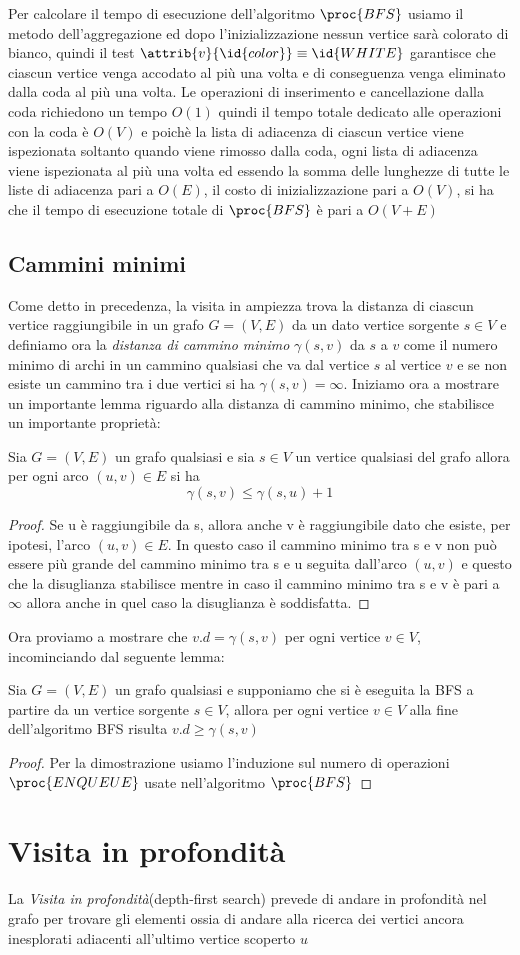 Per calcolare il tempo di esecuzione dell'algoritmo $\proc{BFS}$ usiamo il metodo dell'aggregazione ed dopo l'inizializzazione nessun vertice sarà colorato di bianco, 
quindi il test $\attrib{v}{\id{color}} \equiv \id{WHITE}$ garantisce che ciascun vertice venga accodato al più una volta e di conseguenza venga eliminato dalla coda 
al più una volta.\newline
Le operazioni di inserimento e cancellazione dalla coda richiedono un tempo $O(1)$ quindi il tempo totale dedicato alle operazioni con la coda è $O(V)$ e 
poichè la lista di adiacenza di ciascun vertice viene ispezionata soltanto quando viene rimosso dalla coda, ogni lista di adiacenza viene ispezionata al più una volta
ed essendo la somma delle lunghezze di tutte le liste di adiacenza pari a $O(E)$, il costo di inizializzazione pari a $O(V)$, si ha che il tempo di esecuzione totale
di $\proc{BFS}$ è pari a $O(V + E)$

\subsection{Cammini minimi}
Come detto in precedenza, la visita in ampiezza trova la distanza di ciascun vertice raggiungibile in un grafo $G = (V, E)$ da un dato vertice sorgente $s \in V$ 
e definiamo ora la \emph{distanza di cammino minimo} $\gamma(s, v)$ da $s$ a $v$ come il numero minimo di archi in un cammino qualsiasi che va dal vertice $s$
al vertice $v$ e se non esiste un cammino tra i due vertici si ha $\gamma(s, v) = \infty$.\newline
Iniziamo ora a mostrare un importante lemma riguardo alla distanza di cammino minimo, che stabilisce un importante proprietà:
\begin{lem}
Sia $G = (V, E)$ un grafo qualsiasi e sia $s \in V$ un vertice qualsiasi del grafo allora per ogni arco $(u, v) \in E$ si ha
\[ \gamma(s, v) \leq \gamma(s, u) + 1 \]
\end{lem}
\begin{proof}
Se u è raggiungibile da s, allora anche v è raggiungibile dato che esiste, per ipotesi, l'arco $(u, v) \in E$.\newline
In questo caso il cammino minimo tra s e v non può essere più grande del cammino minimo tra s e u seguita dall'arco $(u, v)$ e questo che la disuglianza stabilisce
mentre in caso il cammino minimo tra s e v è pari a $\infty$ allora anche in quel caso la disuglianza è soddisfatta.
\end{proof}
Ora proviamo a mostrare che $v.d = \gamma(s, v)$ per ogni vertice $v \in V$, incominciando dal seguente lemma:
\begin{lem}
Sia $G = (V, E)$ un grafo qualsiasi e supponiamo che si è eseguita la BFS a partire da un vertice sorgente $s \in V$, allora per ogni vertice $v \in V$
alla fine dell'algoritmo BFS risulta $v.d \geq \gamma(s, v)$
\end{lem}
\begin{proof}
Per la dimostrazione usiamo l'induzione sul numero di operazioni $\proc{ENQUEUE}$ usate nell'algoritmo $\proc{BFS}$
\end{proof}

\section{Visita in profondità}
La \emph{Visita in profondità}(depth-first search) prevede di andare in profondità nel grafo per trovare gli elementi ossia di andare alla ricerca dei vertici ancora inesplorati
adiacenti all'ultimo vertice scoperto $u$
